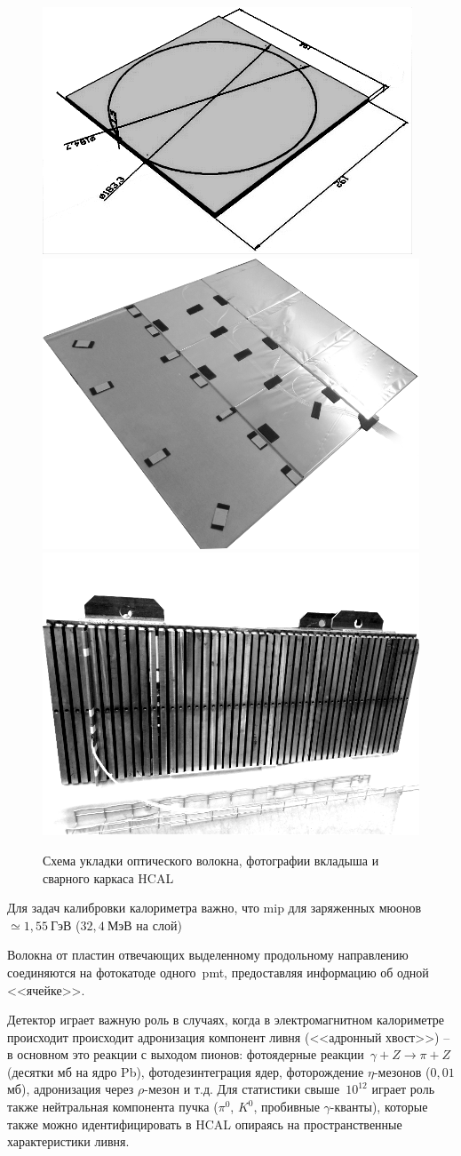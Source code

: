 
\begin{figure}
    \centering
    \includegraphics[width=0.3\linewidth]{images/hcal-cell-single-plastic-element.png}
    \includegraphics[width=0.3\linewidth]{images//illustrative/hcal-inlet-photo.png}
    \includegraphics[width=0.3\linewidth]{images//illustrative/hcal-frame-photo.png}
    \caption{Схема укладки оптического волокна, фотографии вкладыша и сварного каркаса HCAL~\cite{PolyakovHCALDrawings-na64site}}
    \label{fig:hcal-module}
\end{figure}

Для задач калибровки калориметра важно, что \acrshort{mip} для
заряженных мюонов $\simeq1{,}55~\text{ГэВ}$ ($32{,}4~\text{МэВ}$ на слой)

Волокна от пластин отвечающих выделенному продольному направлению
соединяются на фотокатоде одного~\acrshort{pmt}, предоставляя
информацию об одной <<ячейке>>.

Детектор играет важную роль в случаях, когда в электромагнитном
калориметре происходит происходит адронизация компонент
ливня (<<адронный хвост>>) -- в
основном это реакции с выходом пионов: фотоядерные
реакции~$\gamma + Z \rightarrow \pi + Z$ (десятки мб на ядро Pb),
фотодезинтеграция ядер, фоторождение $\eta$-мезонов ($0{,}01$ мб),
адронизация через $\rho$-мезон и т.д. Для статистики
свыше~$10^{12}$ играет роль также нейтральная компонента
пучка ($\pi^0$, $K^0$, пробивные $\gamma$-кванты), которые также
можно идентифицировать в HCAL опираясь на пространственные
характеристики ливня.

